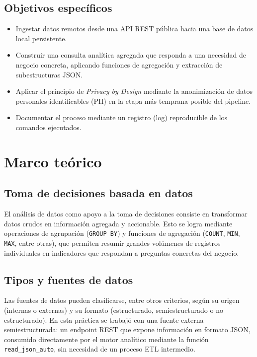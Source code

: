 \documentclass[12pt,letterpaper]{article}
\begin{document}
\subsection{Objetivos específicos}
\begin{itemize}
    \item Ingestar datos remotos desde una API REST pública hacia una base
    de datos local persistente.
    \item Construir una consulta analítica agregada que responda a una
    necesidad de negocio concreta, aplicando funciones de agregación y
    extracción de subestructuras JSON.
    \item Aplicar el principio de \textit{Privacy by Design} mediante la
    anonimización de datos personales identificables (PII) en la etapa más
    temprana posible del pipeline.
    \item Documentar el proceso mediante un registro (log) reproducible de
    los comandos ejecutados.
\end{itemize}


\section{Marco teórico}
 
\subsection{Toma de decisiones basada en datos}
El análisis de datos como apoyo a la toma de decisiones consiste en
transformar datos crudos en información agregada y accionable. \cite{geeksforgeeks-2025} Esto se logra mediante operaciones de agrupación (\texttt{GROUP BY}) y funciones de agregación (\texttt{COUNT}, \texttt{MIN}, \texttt{MAX}, entre otras), que permiten resumir grandes volúmenes de registros individuales en indicadores que respondan a preguntas concretas del negocio.
 
\subsection{Tipos y fuentes de datos}
Las fuentes de datos pueden clasificarse, entre otros criterios, según su
origen (internas o externas) y su formato (estructurado, semiestructurado o
no estructurado).\cite{bridge-2024} En esta práctica se trabajó con una fuente externa semiestructurada: un endpoint REST que expone información en formato JSON,
consumido directamente por el motor analítico mediante la función
\texttt{read\_json\_auto}, sin necesidad de un proceso ETL intermedio.
 
\end{document}
